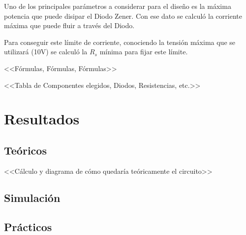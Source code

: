 Uno de los principales parámetros a considerar para el diseño es la máxima potencia que puede disipar el Diodo Zener. Con ese dato se calculó la corriente máxima que puede fluir a través del Diodo.

Para conseguir este límite de corriente, conociendo la tensión máxima que se utilizará (10V) se calculó la $R_s$ mínima para fijar este límite.

<<Fórmulas, Fórmulas, Fórmulas>>

<<Tabla de Componentes elegidos, Diodos, Resistencias, etc.>>

\section{Resultados}

\subsection{Teóricos}
<<Cálculo y diagrama de cómo quedaría teóricamente el circuito>>
\subsection{Simulación}

\subsection{Prácticos}